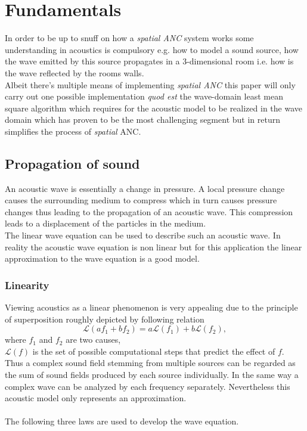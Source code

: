 \chapter{Fundamentals}
\label{chap:fundamentals}
In order to be up to snuff on how a \textit{spatial ANC} system works some understanding in acoustics is compulsory e.g. how to model a sound source, how the wave emitted by this source propagates in a 3-dimensional room i.e. how is the wave reflected by the rooms walls.\\
Albeit there's multiple means of implementing \textit{spatial ANC} this paper will only carry out one possible implementation \textit{quod est} the wave-domain least mean square algorithm which requires for the acoustic model to be realized in the wave domain which has proven to be the most challenging segment but in return simplifies the process of \textit{spatial} ANC.

\section{Propagation of sound}
An acoustic wave is essentially a change in pressure. A local pressure change causes the surrounding medium to compress which in turn causes pressure changes thus leading to the propagation of an acoustic wave. This compression leads to a displacement of the particles in the medium.\\The linear wave equation can be used to describe such an acoustic wave. In reality the acoustic wave equation is non linear but for this application the linear approximation to the wave equation is a good model.\cite{Acoustic}\\
\subsection{Linearity}
Viewing acoustics as a linear phenomenon is very appealing due to the principle of superposition roughly depicted by following relation
\begin{equation}
    \mathcal{L}(af_1+bf_2) = a\mathcal{L}(f_1) + b\mathcal{L}(f_2),
\end{equation}
where
$f_1$ and $f_2$ are two causes,\\
$\mathcal{L}(f)$ is the set of possible computational steps that predict the effect of $f$.\\
Thus a complex sound field stemming from multiple sources can be regarded as the sum of sound fields produced by each source individually. In the same way a complex wave can be analyzed by each frequency separately. Nevertheless this acoustic model only represents an approximation\cite{Rossing2007}.\\
\\
The following three laws are used to develop the wave equation.
